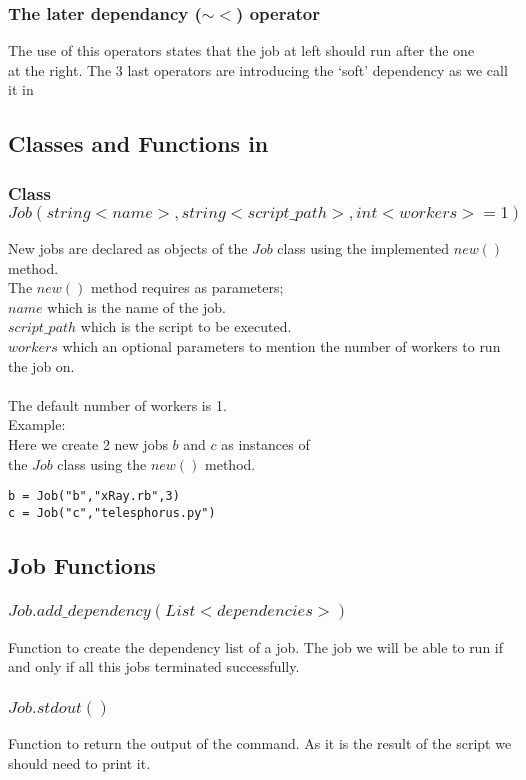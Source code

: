 \subsubsection*{The later dependancy ($\sim<$) operator}
The use of this operators states that the job at left should run after the one\\
at the right.
The 3 last operators are introducing the `soft' dependency as we call it in \lang{}\\
\subsection*{Classes and Functions in \lang{}}
\subsubsection*{Class $Job(string <name>, string <script\_path>, int <workers>=1)$}
New jobs are declared as objects of the $Job$ class using the implemented $new()$ method.\\
The $new()$ method requires as parameters;\\
$name$ which is the name of the job.\\
$script\_path$ which is the script to be executed.\\
$workers$ which an optional parameters to mention the number of workers to run the job on.\\\\
The default number of workers is 1.\\
Example:\\
Here we create 2 new jobs $b$ and $c$ as instances of \\the $Job$ class using the $new()$ method.
\begin{verbatim}
b = Job("b","xRay.rb",3)
c = Job("c","telesphorus.py")
\end{verbatim}
\subsection*{Job Functions}
\subsubsection*{$Job.add\_dependency(List <dependencies>)$}
Function to create the dependency list of a job. The job we will be
able to run if and only if all this jobs terminated successfully.
\subsubsection*{$Job.stdout()$}
Function to return the output of the command. As it is the result of the script we should need to print it.
